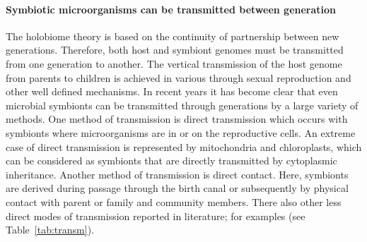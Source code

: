\paragraph{Symbiotic microorganisms can be transmitted between generation}
The holobiome theory is based on the continuity of partnership between new generations. Therefore, both host and symbiont genomes must be transmitted from one generation to another. The vertical transmission of the host genome from parents to children is achieved in various through sexual reproduction and other well defined mechanisms. In recent years it has become clear that even microbial symbionts can be transmitted through generations by a large variety  of methods. One method of transmission is direct transmission which occurs with symbionts where microorganisms are in or on the reproductive cells. An extreme case of direct transmission is represented by mitochondria and chloroplasts, which can be considered as symbionts that are directly transmitted by cytoplasmic inheritance. Another method of transmission is direct contact. Here, symbionts are derived during passage through the birth canal or subsequently by physical contact with parent or family and community members. There also other less direct modes of transmission reported in literature; for examples (see Table~\ref{tab:transm}).
